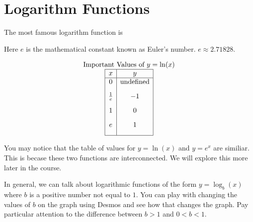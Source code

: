 \documentclass[nooutcomes]{ximera}
\begin{document}
\newpage


\section{Logarithm Functions}


The most famous logarithm function is
\begin{center}
\end{center}
 
Here $e$ is the mathematical constant known as Euler's number. $e \approx 2.71828$.

\begin{center}
\end{center}



\[
\begin{array}{ c  }
  \text{Important Values of $y=\ln(x)$}\\
 \begin{array}{|c|c|}
 \hline
 x & y\\
 \hline
0&\text{undefined}\\[2ex]
\frac{1}{e}&-1\\[2ex]
1&0\\[2ex]
e&1\\[2ex]
 \hline
 \end{array}
\end{array}
 \]


You may notice that the table of values for $y=\ln(x)$ and $y=e^x$ are similiar.  This is becase these two functions are interconnected.  We will explore this more later in the course.



In general, we can talk about logarithmic functions of the form $y=\log_b(x)$ where $b$ is a positive number not equal to $1$.  You can play with changing the values of $b$ on the graph using Desmos and see how that changes the graph.  Pay particular attention to the difference between $b>1$ and $0<b<1$.
\end{document}
